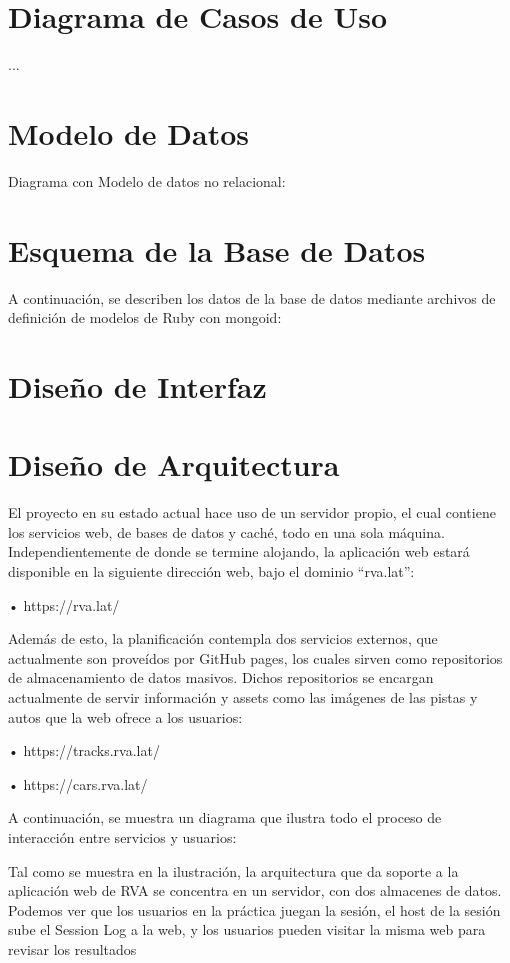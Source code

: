 \section{Diagrama de Casos de Uso}
...

\section{Modelo de Datos}
Diagrama con Modelo de datos no relacional:

\section{Esquema de la Base de Datos}
A continuación, se describen los datos de la base de datos mediante archivos de definición de modelos de Ruby con mongoid:

\section{Diseño de Interfaz}

\section{Diseño de Arquitectura}
El proyecto en su estado actual hace uso de un servidor propio, el cual contiene los servicios web, de bases de datos y caché, todo en una sola máquina. Independientemente de donde se termine alojando, la aplicación web estará disponible en la siguiente dirección web, bajo el dominio “rva.lat”:

•	https://rva.lat/

Además de esto, la planificación contempla dos servicios externos, que actualmente son proveídos por GitHub pages, los cuales sirven como repositorios de almacenamiento de datos masivos. Dichos repositorios se encargan actualmente de servir información y assets como las imágenes de las pistas y autos que la web ofrece a los usuarios:

•	https://tracks.rva.lat/

•	https://cars.rva.lat/

A continuación, se muestra un diagrama que ilustra todo el proceso de interacción entre servicios y usuarios:


Tal como se muestra en la ilustración, la arquitectura que da soporte a la aplicación web de RVA se concentra en un servidor, con dos almacenes de datos. Podemos ver que los usuarios en la práctica juegan la sesión, el host de la sesión sube el Session Log a la web, y los usuarios pueden visitar la misma web para revisar los resultados

